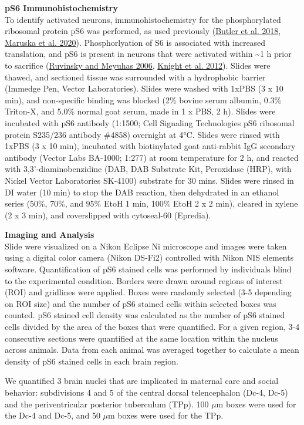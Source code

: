 \documentclass[
  12pt,
]{article}
\begin{document}
\textbf{pS6 Immunohistochemistry}\\
To identify activated neurons, immunohistochemistry for the phosphorylated ribosomal protein pS6 was performed, as used previously (\protect\hyperlink{ref-RN24}{Butler et al. 2018}, \protect\hyperlink{ref-RN18}{Maruska et al. 2020}). Phosphorlyation of S6 is associated with increased translation, and pS6 is present in neurons that were activated within \textasciitilde1 h prior to sacrifice (\protect\hyperlink{ref-RN27}{Ruvinsky and Meyuhas 2006}, \protect\hyperlink{ref-RN25}{Knight et al. 2012}). Slides were thawed, and sectioned tissue was surrounded with a hydrophobic barrier (Immedge Pen, Vector Laboratories). Slides were washed with 1xPBS (3 x 10 min), and non-specific binding was blocked (2\% bovine serum albumin, 0.3\% Triton-X, and 5.0\% normal goat serum, made in 1 x PBS, 2 h). Slides were incubated with pS6 antibody (1:1500; Cell Signaling Technologies pS6 ribosomal protein S235/236 antibody \#4858) overnight at 4°C. Slides were rinsed with 1xPBS (3 x 10 min), incubated with biotinylated goat anti-rabbit IgG secondary antibody (Vector Labs BA-1000; 1:277) at room temperature for 2 h, and reacted with 3,3'-diaminobenzidine (DAB, DAB Substrate Kit, Peroxidase (HRP), with Nickel Vector Laboratories SK-4100) substrate for 30 mins. Slides were rinsed in DI water (10 min) to stop the DAB reaction, then dehydrated in an ethanol series (50\%, 70\%, and 95\% EtoH 1 min, 100\% EtoH 2 x 2 min), cleared in xylene (2 x 3 min), and coverslipped with cytoseal-60 (Epredia).

\textbf{Imaging and Analysis}\\
Slide were visualized on a Nikon Eclipse Ni microscope and images were taken using a digital color camera (Nikon DS-Fi2) controlled with Nikon NIS elements software. Quantification of pS6 stained cells was performed by individuals blind to the experimental condition. Borders were drawn around regions of interest (ROI) and gridlines were applied. Boxes were randomly selected (3-5 depending on ROI size) and the number of pS6 stained cells within selected boxes was counted. pS6 stained cell density was calculated as the number of pS6 stained cells divided by the area of the boxes that were quantified. For a given region, 3-4 consecutive sections were quantified at the same location within the nucleus across animals. Data from each animal was averaged together to calculate a mean density of pS6 stained cells in each brain region.

We quantified 3 brain nuclei that are implicated in maternal care and social behavior: subdivisions 4 and 5 of the central dorsal telencephalon (Dc-4, Dc-5) and the periventricular posterior tuberculum (TPp). 100 \(\mu\)m boxes were used for the Dc-4 and Dc-5, and 50 \(\mu\)m boxes were used for the TPp.
\end{document}
